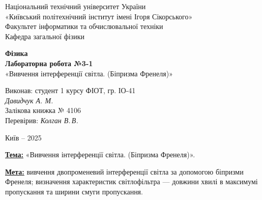 \documentclass[12pt,a4paper]{article}
\begin{document}
    \begin{titlepage}

        \thispagestyle{empty}
        \begin{center}
        \large
        Національний технічний університет України\\
        «Київський політехнічний інститут імені Ігоря Сікорського»\\[1em]
        Факультет інформатики та обчислювальної техніки\\
        Кафедра загальної фізики
        \end{center}

        \vfill

        \begin{center}
        \textbf{\LARGE Фізика}\\[2em]
        \textbf{\Large Лабораторна робота №3-1}\\
        «Вивчення інтерференції світла. (Біпризма Френеля)» 
        \end{center}

        \vfill

        \begin{flushright}
        Виконав: студент 1 курсу ФІОТ, гр. ІО-41\\
        \textit{Давидчук А. М.}\\
        Залікова книжка № 4106\\[1em]
        Перевірив: \textit{Колган В.\,В.}
        \end{flushright}

        \vfill

        \begin{center}
        Київ -- 2025
        \end{center}

    \end{titlepage}

    \setlength{\parindent}{0pt}

    \textbf{\underline{Тема:}} «Вивчення інтерференції світла. (Біпризма Френеля)».

    \vspace{1em}

    \textbf{\underline{Мета:}} вивчення двопроменевий інтерференції світла за допомогою біпризми Френеля;
    визначення характеристик світлофільтра --- довжини хвилі в максимумі пропускання та ширини смуги пропускання.

    \vspace{1em}
\end{document}
